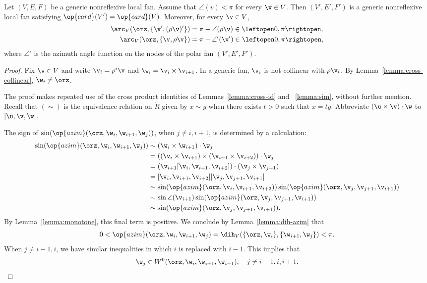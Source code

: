 \begin{lemma}\label{lemma:polar-fan}
  Let $(V,E,F)$ be a generic nonreflexive local fan. 
Assume that $\angle(v)<\pi$ for every $\v\in V$.  Then $(V',E',F')$ is
a generic nonreflexive local fan satisfying $\op{card}(V')=\op{card}(V)$.
Moreover, for every $\v\in V$,
\begin{align*}
\arc_V(\orz,\{\v',(\rho\v)'\}) &= \pi - \angle(\rho\v) \in \leftopen 0,\pi\rightopen,\\
\arc_V(\orz,\{\v,\rho\v\}) &= \pi - \angle'(\v')\in\leftopen 0,\pi\rightopen,
\end{align*}
where $\angle'$ is the azimuth angle function on the nodes of the polar fan $(V',E',F')$.
\end{lemma}


\begin{proof}
Fix $\v\in V$ and write $\v_i = \rho^i \v$ and $\w_i = \v_i
  \times \v_{i+1}$.  In a generic fan, $\v_i$ is not collinear with
  $\rho\v_i$.  By Lemma~\ref{lemma:cross-collinear}, $\w_i\ne\orz$.

  The proof makes repeated use of the cross product identities of
  Lemmas~\ref{lemma:cross-id} and ~\ref{lemma:sim}, without further
  mention.  Recall that $(\sim)$ is the equivalence relation on
  $\ring{R}$ given by $x\sim y$ when there exists $t>0$ such that $x =
  t y$.  Abbreviate $(\u\times \v)\cdot \w$ to $[\u,\v,\w]$.


The sign of
  $\sin(\op{azim}(\orz,\w_i,\w_{i+1},\w_j))$, when $j\ne i,i+1$, is determined
by a calculation:
\begin{align*}
\sin(\op{azim}(\orz,\w_i,\w_{i+1},\w_j)) &\sim (\w_i \times \w_{i+1})\cdot \w_j\\
&= ((\v_i\times \v_{i+1})\times (\v_{i+1}\times \v_{i+2}))\cdot \w_j\\
&= (\v_{i+1} [\v_{i},\v_{i+1},\v_{i+2}])\cdot (\v_j\times \v_{j+1})\\
&= [\v_i,\v_{i+1},\v_{i+2}][\v_j,\v_{j+1},\v_{i+1}]\\
&\sim \sin(\op{azim}(\orz,\v_i,\v_{i+1},\v_{i+2})) 
   \sin(\op{azim}(\orz,\v_j,\v_{j+1},\v_{i+1}))\\
&\sim \sin\angle(\v_{i+1}) \sin(\op{azim}(\orz,\v_j,\v_{j+1},\v_{i+1}))\\
&\sim \sin(\op{azim}(\orz,\v_j,\v_{j+1},\v_{i+1})).
\end{align*}
By Lemma~\ref{lemma:monotone}, this final term is positive.  We
conclude by Lemma~\ref{lemma:dih-azim} that 
\[
0<\op{azim}(\orz,\w_i,\w_{i+1},\w_j) = \dih_V(\{\orz,\w_{i}\},\{\w_{i+1},\w_j\}) < \pi.
\]  
When $j\ne i-1,i$, we have similar inequalities in which $i$ is
replaced with $i-1$. This implies that
\begin{equation}\label{eqn:wj}
\w_j\in W^0(\orz,\w_{i},\w_{i+1},\w_{i-1}),\quad j\ne i-1, i, i+1.
\end{equation}


\end{proof}
